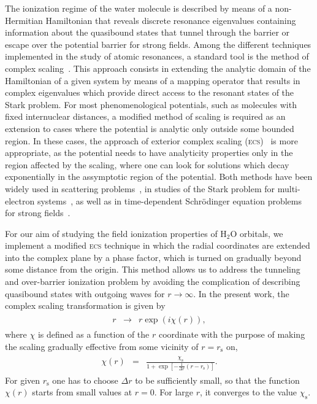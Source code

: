 The ionization regime of the water molecule is described by means of a
non-Hermitian Hamiltonian that reveals discrete resonance eigenvalues
containing information about the quasibound states that tunnel through
the barrier or escape over the potential barrier for strong
fields. Among the different techniques implemented in the study of
atomic resonances, a standard tool is the method of complex
scaling~\cite{complexScaling,complexScalingBaslev,complexScalingSimon}. This
approach consists in extending the analytic domain of the Hamiltonian
of a given system by means of a mapping operator that results in
complex eigenvalues which provide direct access to the resonant states
of the Stark problem. For most phenomenological potentials, such as
molecules with fixed internuclear distances, a modified method of
scaling is required as an extension to cases where the potential is
analytic only outside some bounded region. In these cases, the
approach of exterior complex scaling (\textsc{ecs})~\cite{Simon_1979}
is more appropriate, as the potential needs to have analyticity
properties only in the region affected by the scaling, where one can
look for solutions which decay exponentially in the assymptotic region
of the potential. Both methods have been widely used in scattering
problems~\cite{complexScalingBaslev, complexScalingSimon}, in studies
of the Stark problem for multi-electron
systems~\cite{ScrinziJChemPhys_ECS,ScrinziJPhysB_ECS}, as well as in
time-dependent Schr\"{o}dinger equation problems for strong
fields~\cite{ecsRuiz, ecsTao, ecsScrinzi}.

For our aim of studying the field ionization properties of H$_{2}$O
orbitals, we implement a modified \textsc{ecs} technique in which the
radial coordinates are extended into the complex plane by a phase
factor, which is turned on gradually beyond some distance from the
origin. This method allows us to address the tunneling and
over-barrier ionization problem by avoiding the complication of
describing quasibound states with outgoing waves for $r \to
\infty$. In the present work, the complex scaling transformation is
given by
%
\begin{eqnarray}
  \begin{split}
    r & \rightarrow & r\exp(i\chi(r)),
  \end{split}
\label{eq:ecs_r}
\end{eqnarray}
%
where $\chi$ is defined as a function of the $r$ coordinate with the
purpose of making the scaling gradually effective from some vicinity
of $r = r_{\mathrm{s}}$ on,
%
\begin{eqnarray}
  \begin{split}
    \chi(r) & = & \frac{\chi_{\mathrm{s}}}{1+\exp[-\frac{1}{\Delta r}
        (r - r_{\mathrm{s}})]}.
  \end{split}
\label{eq:ecs_theta}
\end{eqnarray} 
%
For given $r_{\mathrm{s}}$ one has to choose $\Delta r$ to be
sufficiently small, so that the function $\chi(r)$ starts from small
values at $r = 0$. For large $r$, it converges to the value
$\chi_{\mathrm{s}}$.

